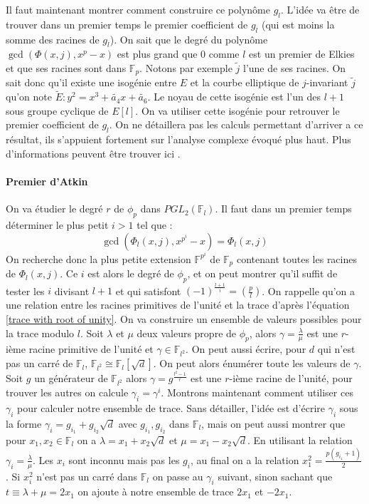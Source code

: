 \documentclass[12pt]{article}
\begin{document}
Il faut maintenant montrer comment construire ce polynôme $g_l$. L'idée va être de trouver dans un premier temps le premier coefficient de $g_l$ (qui est moins la somme des racines de $g_l$). On sait que le degré du polynôme $\gcd(\Phi(x,j),x^p-x)$ est plus grand que $0$ comme $l$ est un premier de Elkies et que ses racines sont dans $\mathbb{F}_p$. Notons par exemple $\tilde{j}$ l'une de ses racines. On sait donc qu'il existe une isogénie entre $E$ et la courbe elliptique de $j$-invariant $\tilde{j}$ qu'on note $\tilde{E}:y^2=x^3+\tilde{a_4}x+\tilde{a_6}$. Le noyau de cette isogénie est l'un des $l+1$ sous groupe cyclique de $E[l]$. On va utiliser cette isogénie pour retrouver le premier coefficient de $g_l$. On ne détaillera pas les calculs permettant d'arriver a ce résultat, ils s'appuient fortement sur l'analyse complexe évoqué plus haut. Plus d'informations peuvent être trouver ici \cite{sea}.


\paragraph*{Premier d'Atkin}
On va étudier le degré $r$ de $\phi_p$ dans $PGL_2(\mathbb{F}_l)$. Il faut dans un premier temps déterminer le plus petit $i>1$ tel que : 
\begin{equation}
\gcd(\Phi_l(x,j), x^{p^i} - x) = \Phi_l(x,j)
\end{equation}
On recherche donc la plus petite extension $\mathbb{F}^{p^i}$ de $\mathbb{F}_p$ contenant toutes les racines de $\Phi_l(x,j)$. Ce $i$ est alors le degré de $\phi_p$, et on peut montrer qu'il suffit de tester les $i$ divisant $l+1$ et qui satisfont $(-1)^{\frac{l+1}{i}}= (\frac{p}{l})$. On rappelle qu'on a une relation entre les racines primitives de l'unité et la trace d’après l'équation \ref{trace with root of unity}. On va construire un ensemble de valeurs possibles pour la trace modulo $l$. Soit $\lambda$ et $\mu$ deux valeurs propre de $\phi_p$, alors $\gamma = \frac{\lambda}{\mu}$ est une $r$-ième racine primitive de l'unité et $\gamma \in \mathbb{F}_{l^2}$. On peut aussi écrire, pour $d$ qui n'est pas un carré de $\mathbb{F}_l$, $\mathbb{F}_{l^2} \cong \mathbb{F}_l[\sqrt{d}]$. On peut alors énumérer toute les valeurs de $\gamma$. Soit $g$ un générateur de $\mathbb{F}_{l^2}$ alors $\gamma = g^{\frac{l^2-1}{r}}$ est une $r$-ième racine de l'unité, pour trouver les autres on calcule $\gamma_i = \gamma^i$. Montrons maintenant comment utiliser ces $\gamma_i$ pour calculer notre ensemble de trace. Sans détailler, l'idée est d'écrire $\gamma_i$ sous la forme $\gamma_i = g_{i_1} + g_{i_2}\sqrt{d}$ avec $g_{i_1}, g_{i_2}$ dans $\mathbb{F}_l$, mais on peut aussi montrer que pour $x_1, x_2 \in \mathbb{F}_l$ on a $\lambda = x_1 + x_2\sqrt{d}$ et $\mu = x_1-x_2\sqrt{d}$. En utilisant la relation $\gamma_i = \frac{\lambda}{\mu}$. Les $x_i$ sont inconnu mais pas les $g_{i}$, au final on a la relation $x_1^2 = \frac{p(g_{i_1}+1)}{2}$. Si $x_i^2$ n'est pas un carré dans $\mathbb{F}_l$ on passe au $\gamma_i$ suivant, sinon sachant que $t \equiv \lambda + \mu = 2x_1$ on ajoute à notre ensemble de trace $2x_1$ et $-2x_1$.
\end{document}
